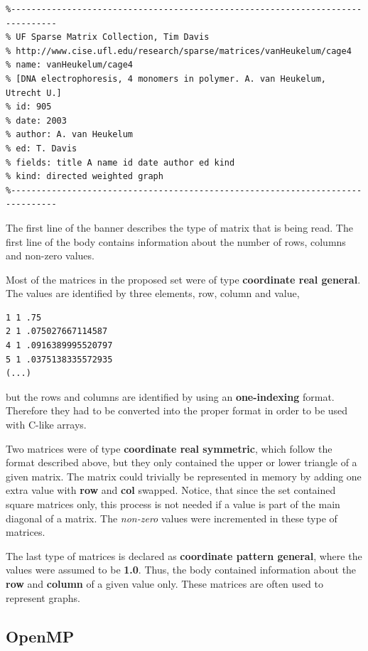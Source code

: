 \documentclass[12pt]{article}
\begin{document}
\begin{lstlisting}[style=banner]
%%MatrixMarket matrix coordinate real general
%-------------------------------------------------------------------------------
% UF Sparse Matrix Collection, Tim Davis
% http://www.cise.ufl.edu/research/sparse/matrices/vanHeukelum/cage4
% name: vanHeukelum/cage4
% [DNA electrophoresis, 4 monomers in polymer. A. van Heukelum, Utrecht U.]
% id: 905
% date: 2003
% author: A. van Heukelum
% ed: T. Davis
% fields: title A name id date author ed kind
% kind: directed weighted graph
%-------------------------------------------------------------------------------
\end{lstlisting}

\par The first line of the banner describes the type of matrix that is being read. The first line of the body contains information about the number of rows, columns and non-zero values. 
\par Most of the matrices in the proposed set were of type \textbf{coordinate real general}. The values are identified by three elements, row, column and value,

\begin{lstlisting}[style=banner]
1 1 .75
2 1 .075027667114587
4 1 .0916389995520797
5 1 .0375138335572935
(...)
\end{lstlisting}

but the rows and columns are identified by using an \textbf{one-indexing} format. Therefore they had to be converted into the proper format in order to be used with C-like arrays. 
\par Two matrices were of type \textbf{coordinate real symmetric}, which follow the format described above, but they only contained the upper or lower triangle of a given matrix. The matrix could trivially be represented in memory by adding one extra value with \textbf{row} and \textbf{col} swapped. Notice, that since the set contained square matrices only, this process is not needed if a value is part of the main diagonal of a matrix. The \textit{non-zero} values were incremented in these type of matrices.
\par The last type of matrices is declared as \textbf{coordinate pattern general}, where the values were assumed to be \textbf{1.0}. Thus, the body contained information about the \textbf{row} and \textbf{column} of a given value only. These matrices are often used to represent graphs.


\subsection*{OpenMP}
\end{document}
